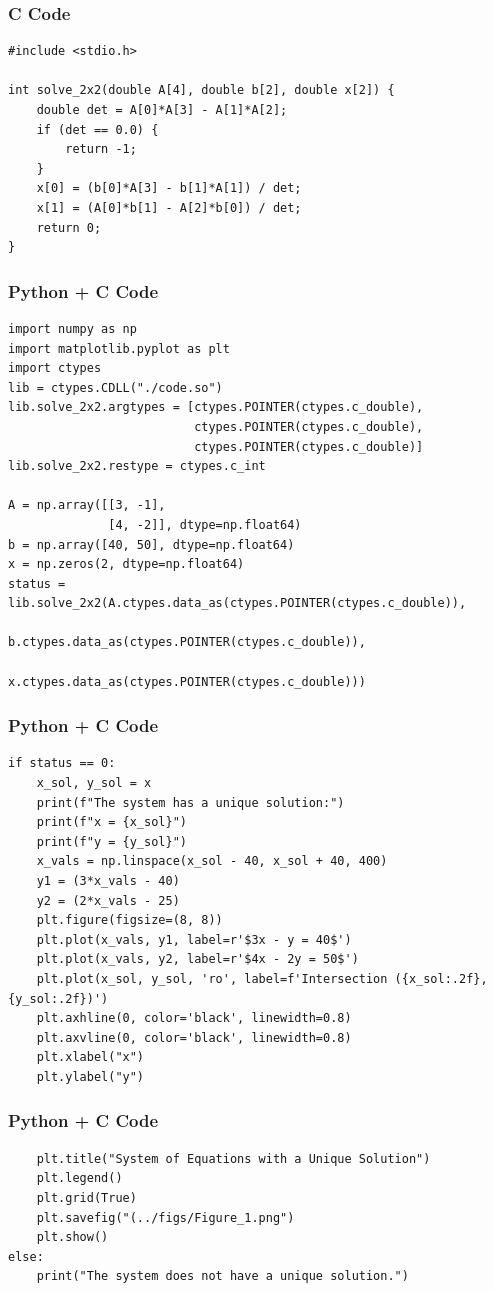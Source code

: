 \documentclass{beamer}
\begin{document}
\begin{frame}[fragile]
    \frametitle{C Code}
    \begin{lstlisting}
#include <stdio.h>

int solve_2x2(double A[4], double b[2], double x[2]) {
    double det = A[0]*A[3] - A[1]*A[2]; 
    if (det == 0.0) {
        return -1; 
    }
    x[0] = (b[0]*A[3] - b[1]*A[1]) / det;
    x[1] = (A[0]*b[1] - A[2]*b[0]) / det;
    return 0; 
}
    \end{lstlisting}
\end{frame}

\begin{frame}[fragile]
    \frametitle{Python + C Code}
    \begin{lstlisting}
import numpy as np
import matplotlib.pyplot as plt
import ctypes
lib = ctypes.CDLL("./code.so")   
lib.solve_2x2.argtypes = [ctypes.POINTER(ctypes.c_double),
                          ctypes.POINTER(ctypes.c_double),
                          ctypes.POINTER(ctypes.c_double)]
lib.solve_2x2.restype = ctypes.c_int

A = np.array([[3, -1],
              [4, -2]], dtype=np.float64)
b = np.array([40, 50], dtype=np.float64)
x = np.zeros(2, dtype=np.float64)
status = lib.solve_2x2(A.ctypes.data_as(ctypes.POINTER(ctypes.c_double)),
                       b.ctypes.data_as(ctypes.POINTER(ctypes.c_double)),
                       x.ctypes.data_as(ctypes.POINTER(ctypes.c_double)))
    \end{lstlisting}
\end{frame}

\begin{frame}[fragile]
    \frametitle{Python + C Code}
    \begin{lstlisting}
if status == 0:
    x_sol, y_sol = x
    print(f"The system has a unique solution:")
    print(f"x = {x_sol}")
    print(f"y = {y_sol}")
    x_vals = np.linspace(x_sol - 40, x_sol + 40, 400)
    y1 = (3*x_vals - 40)
    y2 = (2*x_vals - 25)
    plt.figure(figsize=(8, 8))
    plt.plot(x_vals, y1, label=r'$3x - y = 40$')
    plt.plot(x_vals, y2, label=r'$4x - 2y = 50$')
    plt.plot(x_sol, y_sol, 'ro', label=f'Intersection ({x_sol:.2f}, {y_sol:.2f})')
    plt.axhline(0, color='black', linewidth=0.8)
    plt.axvline(0, color='black', linewidth=0.8)
    plt.xlabel("x")
    plt.ylabel("y")
    \end{lstlisting}
\end{frame}

\begin{frame}[fragile]
    \frametitle{Python + C Code}
    \begin{lstlisting}
    plt.title("System of Equations with a Unique Solution")
    plt.legend()
    plt.grid(True)
    plt.savefig("(../figs/Figure_1.png")
    plt.show()
else:
    print("The system does not have a unique solution.")
    \end{lstlisting}
\end{frame}
\end{document}
